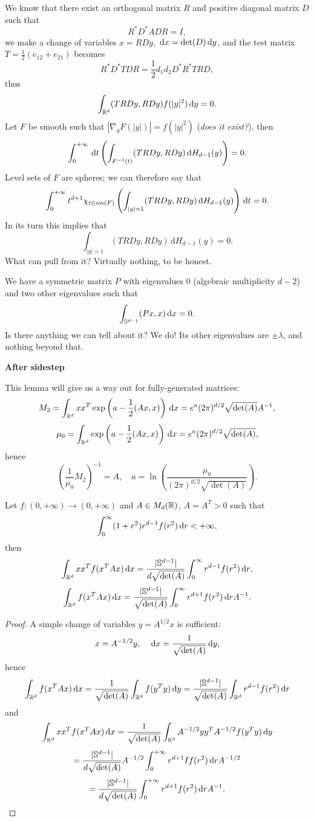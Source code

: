 \documentclass{article}
\begin{document}
We know that there exist an orthogonal matrix $R$ and positive diagonal matrix $D$ such that
\[
	R^*D^*ADR=I,
\]
we make a change of variables $x=RDy$, ${\,\mathrm{d} x}=\det(D){\,\mathrm dy}$, and the test matrix $T=\frac 12(e_{12}+e_{21})$ becomes
\[
	R^*D^*TDR = \frac 12 d_1d_2 D^*R^* T RD,
\]
thus 
\[
	\int_{{\mathbb R^d}}(TRDy,RDy)f(|y|^2){\,\mathrm dy}=0.
\]
Let $F$ be smooth such that $|\nabla_y F(|y|)|=f(|y|^2)$ (\textit{does it exist?}), then
\[
	\int_{0}^{+\infty}{\,\mathrm dt}\left( \int_{F^{-1}(t)}(TRDy,RDy)\,\mathrm d H_{d-1}(y) \right)=0.
\]
Level sets of $F$ are spheres; we can therefore say that
\[
	\int_{0}^{+\infty}t^{d+1}\chi_{t\in im(F)}\left( \int_{|y|=1}(TRDy,RDy)\,\mathrm d H_{d-1}(y) \right){\,\mathrm dt}=0.
\]
In its turn this implies that
\[
	\int_{|y|=1}(TRDy,RDy)\,\mathrm d H_{d-1}(y)=0.
\]
What can pull from it? Virtually nothing, to be honest.

We have a symmetric matrix $P$ with eigenvalues $0$ (algebraic multiplicity $d-2$) and two other eigenvalues such that
\[
	\int_{{\mathbb S^{d-1}}}(Px,x){\,\mathrm{d} x}=0.
\]
Is there anything we can tell about it? We do! Its other eigenvalues are $\pm\lambda $, and nothing beyond that.

\textbf{After sidestep}

This lemma will give us a way out for fully-generated matrices:
\[
	M_2=\int_{{\mathbb R^d}}^{}xx^T\exp\left( a-\frac{1}{2}(Ax,x) \right){\,\mathrm{d} x} = e^a(2\pi)^{d/2}\sqrt{\det(A)}A^{-1},
\]
\[
	\mu_0=\int_{{\mathbb R^d}}\exp\left(a -\frac{1}{2}(Ax,x) \right){\,\mathrm{d} x} =e^a (2\pi)^{d/2}\sqrt{\det(A)},
\]
hence
\[
	\left(  \frac{1}{\mu_0}M_2\right)^{-1}=A, \quad a = \ln\left( \frac{\mu_0}{(2\pi)^{d/2}\sqrt{\det(A)}} \right).
\]

\begin{lemma}
	Let $f:(0,+\infty)\to(0,+\infty) $ and $A\in M_d({\mathbb R})$, $A=A^T>0$ such that
	\[
		\int_{0}^{\infty}(1+r^2)r^{d-1}f(r^2){\,\mathrm dr}<+\infty,
	\]
	then
	\[
		\int_{{\mathbb R^d}}xx^Tf(x^TAx){\,\mathrm{d} x} = \frac{|{\mathbb S^{d-1}}|}{d\sqrt {\det(A)}} \int_{0}^{\infty}r^{d-1}f(r^2){\,\mathrm dr}  ,
	\]
	\[
		\int_{{\mathbb R^d}}f(x^TAx){\,\mathrm{d} x} = \frac{|{\mathbb S^{d-1}}|}{\sqrt {\det(A)}}  \int_{0}^{\infty}r^{d+1}f(r^2){\,\mathrm dr} A^{-1}.
	\]
\end{lemma}
\begin{proof}
A simple change of variables $y=A^{1/2}x$ is sufficient:
\[
	x=A^{-1/2}y,\quad {\,\mathrm{d} x} =\frac{1}{\sqrt {\det(A)}}{\,\mathrm dy},
\]
hence
	\[
		\int_{{\mathbb R^d}}f(x^TAx){\,\mathrm{d} x} 
		=\frac{1}{\sqrt {\det(A)}}\int_{{\mathbb R^d}}f(y^T y){\,\mathrm dy}
		=\frac{|{\mathbb S^{d-1}}|}{\sqrt {\det(A)}}\int_{{\mathbb R^d}}r^{d-1}f(r^2){\,\mathrm dr}
	\]
and
\[
	\int_{{\mathbb R^d}}x x^Tf(x^TAx){\,\mathrm{d} x}  
	=\frac{1}{\sqrt {\det(A)}} \int_{{\mathbb R^d}}A^{-1/2}yy^TA^{-1/2}f(y^T y){\,\mathrm dy}
\]
\[
	=\frac{|{\mathbb S^{d-1}}|}{d\sqrt {\det(A)}} A^{-1/2} \int_{0}^{+\infty}r^{d+1} I f(r^2){\,\mathrm dr} A^{-1/2}
\]
\[
	=\frac{|{\mathbb S^{d-1}}|}{d\sqrt {\det(A)}}\int_{0}^{+\infty}r^{d+1}   f(r^2){\,\mathrm dr}  A^{-1}  .
\]
\end{proof}



\end{document}
